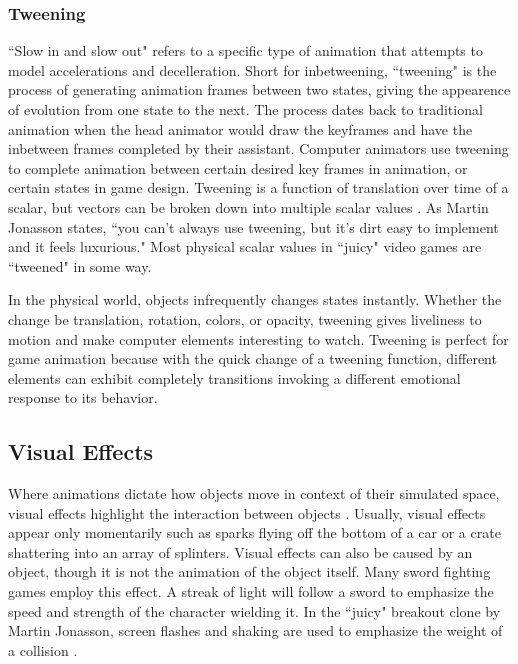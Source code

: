 \subsubsection{Tweening}

``Slow in and slow out" refers to a specific type of animation that attempts to model accelerations and decelleration. Short for inbetweening, ``tweening" is the process of generating animation frames between two states, giving the appearence of evolution from one state to the next. The process dates back to traditional animation when the head animator would draw the keyframes and have the inbetween frames completed by their assistant. Computer animators use tweening to complete animation between certain desired key frames in animation, or certain states in game design. Tweening is a function of translation over time of a scalar, but vectors can be broken down into multiple scalar values \cite{penner2002robert}. As Martin Jonasson states, ``you can't always use tweening, but it's dirt easy to implement and it feels luxurious." \cite{juiceitorloseit} Most physical scalar values in ``juicy" video games are ``tweened" in some way.

In the physical world, objects infrequently changes states instantly. Whether the change be translation, rotation, colors, or opacity, tweening gives liveliness to motion and make computer elements interesting to watch. Tweening is perfect for game animation because with the quick change of a tweening function, different elements can exhibit completely transitions invoking a different emotional response to its behavior.

\subsection{Visual Effects}

Where animations dictate how objects move in context of their simulated space, visual effects highlight the interaction between objects \cite{swink2009game}. Usually, visual effects appear only momentarily such as sparks flying off the bottom of a car or a crate shattering into an array of splinters. Visual effects can also be caused by an object, though it is not the animation of the object itself. Many sword fighting games employ this effect. A streak of light will follow a sword to emphasize the speed and strength of the character wielding it. In the ``juicy" breakout clone by Martin Jonasson, screen flashes and shaking are used to emphasize the weight of a collision \cite{juiceitorloseit}.

